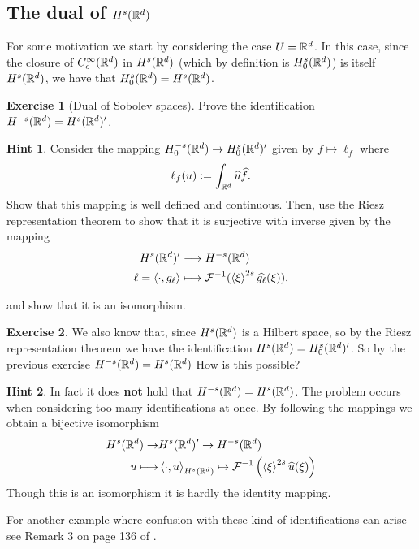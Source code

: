 \documentclass[12pt]{article}
\theoremstyle{definition}
\newtheorem{exercise}{Exercise}
\newtheorem*{hint}{Hint}
\newcommand{\br}[1]{\left\langle#1\right\rangle} \newcommand{\set}[1]{\left\{#1\right\}} \newcommand{\qp}[1]{\left(#1\right)}\newcommand{\qb}[1]{\left[#1\right]}
\begin{document}
\subsection{The dual of $H^s(\mathbb{R}^d)$}
For some motivation we start by considering the case $U=\mathbb{R}^d$. In this case, since the closure of
$C_c^\infty(\mathbb{R}^d)$ in $H^s(\mathbb{R}^d)$ (which by definition is $H_0^s(\mathbb{R}^d)$) is itself $H^s(\mathbb{R}^d)$, we have that $H_0^s(\mathbb{R}^d)=H^s(\mathbb{R}^d)$.
\begin{exercise}[Dual of Sobolev spaces]\label{dual exercise}
	Prove the identification $H^{-s}(\mathbb{R}^d)=H^s(\mathbb{R}^d)'$.
\end{exercise}
\begin{hint}

	Consider the mapping  $H_0^{-s}(\mathbb{R}^d) \to H^s_0(\mathbb{R}^d)'$ given by $f \mapsto \ell_f$ where
	\begin{align*}
		\ell_f(u):= \int_{\mathbb{R}^d}\widehat{u} \widehat{f} .
	\end{align*}
	Show that this mapping is well defined and continuous. Then, use the Riesz representation theorem to show that it is surjective with inverse given by the mapping
	\begin{align*}
		H^s(\R^d)'                & \longrightarrow H^{-s}(\R^d)                                 \\
		\ell = \br{\cdot, g_\ell} & \longmapsto \mathcal{F}^{-1}(\br{\xi}^{2s}\wh{g_\ell}(\xi ))
		.\end{align*}


	and show that it is an isomorphism.
\end{hint}
\begin{exercise}
	We also know that, since $H^s(\mathbb{R}^d)$ is a Hilbert space, so by the Riesz representation theorem we have the identification $H^s(\mathbb{R}^d) = H^{s}_0(\mathbb{R}^d)'$. So by the previous exercise $H^{-s}(\mathbb{R}^d)= H^s(\mathbb{R}^d)$ How is this possible?
\end{exercise}
\begin{hint}
	In fact it does \textbf{not} hold that $H^{-s}(\mathbb{R}^d)= H^s(\mathbb{R}^d)$. The problem occurs when considering too many identifications at once. By following the mappings we obtain a bijective isomorphism
	\begin{align*}
		H^{s}(\R^d) \to & H^s(\R^d)' \to H^{-s}(\R^d)                                                              \\
		u \longmapsto   & \br{\cdot, u}_{H^s(\R^d)} \mapsto \mathcal{F}^{-1}\left(\br{\xi}^{2s}\wh{u}(\xi )\right)
	\end{align*}
	Though this is an isomorphism it is hardly the identity mapping.
\end{hint}
For another example where confusion with these kind of identifications can arise see Remark 3 on page  136 of \cite{brezis2011functional}.
\end{document}
